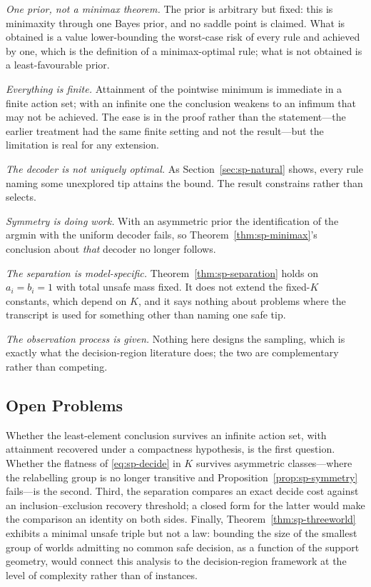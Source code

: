 \documentclass[conference]{IEEEtran}
\theoremstyle{definition}
\begin{document}
\emph{One prior, not a minimax theorem.} The prior is arbitrary but fixed: this is minimaxity
through one Bayes prior, and no saddle point is claimed. What is obtained is a value
lower-bounding the worst-case risk of every rule and achieved by one, which is the definition
of a minimax-optimal rule; what is not obtained is a least-favourable prior.

\emph{Everything is finite.} Attainment of the pointwise minimum is immediate in a finite
action set; with an infinite one the conclusion weakens to an infimum that may not be achieved.
The ease is in the proof rather than the statement---the earlier treatment had the same finite
setting and not the result---but the limitation is real for any extension.

\emph{The decoder is not uniquely optimal.} As Section~\ref{sec:sp-natural} shows, every rule
naming some unexplored tip attains the bound. The result constrains rather than selects.

\emph{Symmetry is doing work.} With an asymmetric prior the identification of the argmin with
the uniform decoder fails, so Theorem~\ref{thm:sp-minimax}'s conclusion about \emph{that} decoder
no longer follows.

\emph{The separation is model-specific.} Theorem~\ref{thm:sp-separation} holds on
$a_{i}=b_{i}=1$ with total unsafe mass fixed. It does not extend the fixed-$K$ constants,
which depend on $K$, and it says nothing about problems where the transcript is used for
something other than naming one safe tip.

\emph{The observation process is given.} Nothing here designs the sampling, which is exactly
what the decision-region literature does; the two are complementary rather than competing.

\subsection{Open Problems}

Whether the least-element conclusion survives an infinite action set, with attainment recovered
under a compactness hypothesis, is the first question. Whether the flatness of
\eqref{eq:sp-decide} in $K$ survives asymmetric classes---where the relabelling group is no longer
transitive and Proposition~\ref{prop:sp-symmetry} fails---is the second. Third, the separation
compares an exact decide cost against an inclusion--exclusion recovery threshold; a closed form
for the latter would make the comparison an identity on both sides. Finally, Theorem~\ref{thm:sp-threeworld} exhibits a
minimal unsafe triple but not a law: bounding the size of the smallest group of worlds
admitting no common safe decision, as a function of the support geometry, would connect this
analysis to the decision-region framework at the level of complexity rather than of
instances.
\end{document}

